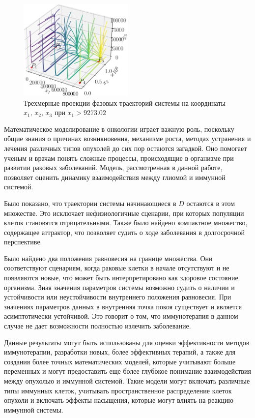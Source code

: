 \documentclass[14pt,a4paper]{extarticle}
\begin{document}
\begin{example}
		\begin{figure}[h]
			\centering
			\includegraphics[width=0.50\textwidth]{media/Figure_14.png}
			\caption{Трехмерные проекции фазовых траекторий системы на координаты $x_1,\, x_2,\, x_3$ при $x_1 > 9273.02$}
			\label{fig:model_K5_new}
		\end{figure}
	\end{example}
	
	\begin{conclusion}
	Математическое моделирование в онкологии играет важную роль, поскольку общие знания о причинах возникновения, механизме роста, методах устранения и лечения различных типов опухолей до сих пор остаются загадкой. Оно помогает ученым и врачам понять сложные процессы, происходящие в организме при развитии раковых заболеваний. Модель, рассмотренная в данной работе, позволяет оценить динамику взаимодействия между глиомой и иммунной системой.
	
	Было показано, что траектории системы начинающиеся в $D$ остаются в этом множестве. Это исключает нефизиологичные сценарии, при которых популяции клеток становятся отрицательными. Также было найдено компактное множество, содержащее аттрактор, что позволяет судить о ходе заболевания в долгосрочной перспективе.
	
	Было найдено два положения равновесия на границе множества. Они соответствуют сценариям, когда раковые клетки в начале отсутствуют и не появляются новые, что может быть интерпретировано как здоровое состояние организма. Зная значения параметров системы возможно судить о наличии и устойчивости или неустойчивости внутреннего положения равновесия. При значениях параметров данных в \cite{model_params} внутренняя точка покоя существует и является асимптотически устойчивой. Это говорит о том, что иммунотерапия в данном случае не дает возможности полностью излечить заболевание. 
	
	Данные результаты могут быть использованы для оценки эффективности методов иммунотерапии, разработки новых, более эффективных терапий, а также для создания более точных математических моделей, которые учитывают больше переменных и могут предоставить еще более глубокое понимание взаимодействия между опухолью и иммунной системой. Такие модели могут включать различные типы иммунных клеток, учитывать пространственное распределение клеток опухоли и включать эффекты насыщения, которые могут влиять на реакцию иммунной системы.
	\end{conclusion}
	
\end{document}
